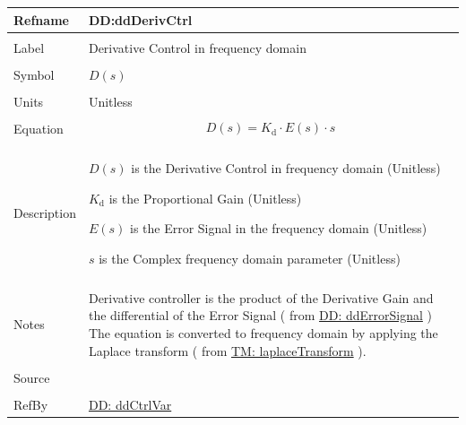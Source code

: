 \documentclass[12pt]{article}
\begin{document}
\vspace{\baselineskip}
\noindent
\begin{minipage}{\textwidth}
\begin{tabular}{>{\raggedright}p{}>{\raggedright\arraybackslash}p{}}
\toprule \textbf{Refname} & \textbf{DD:ddDerivCtrl}
\label{DD:ddDerivCtrl}
\\ \midrule \\
Label & Derivative Control in frequency domain
        
\\ \midrule \\
Symbol & $D(s)$
         
\\ \midrule \\
Units & Unitless
        
\\ \midrule \\
Equation & \begin{displaymath}
           D(s)={K_{\text{d}}}\cdot{}E(s)\cdot{}s
           \end{displaymath}
\\ \midrule \\
Description & \begin{symbDescription}
              \item{$D(s)$ is the Derivative Control in frequency domain (Unitless)}
              \item{${K_{\text{d}}}$ is the Proportional Gain (Unitless)}
              \item{$E(s)$ is the Error Signal in the frequency domain (Unitless)}
              \item{$s$ is the Complex frequency domain parameter (Unitless)}
              \end{symbDescription}
\\ \midrule \\
Notes & Derivative controller is the product of the Derivative Gain and the differential of the Error Signal ( from  \hyperref[DD:ddErrorSignal]{DD: ddErrorSignal} ) The equation is converted to frequency domain by applying the Laplace transform ( from \hyperref[TM:laplaceTransform]{TM: laplaceTransform} ).
        
\\ \midrule \\
Source & \cite{johnson2008}
         
\\ \midrule \\
RefBy & \hyperref[DD:ddCtrlVar]{DD: ddCtrlVar}
        
\\ \bottomrule
\end{tabular}
\end{minipage}
\end{document}
